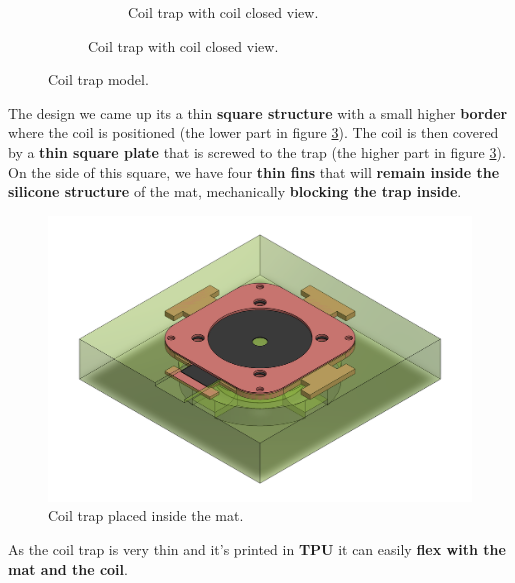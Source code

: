 \begin{figure}[H]
\begin{subfigure}[b]{0.8\linewidth}
\begin{subfigure}[b]{0.475\textwidth}
            \caption{Coil trap with coil closed view.}
            \label{fig: coil_trap_closed}
        \end{subfigure}
    \end{subfigure}   
    \caption{Coil trap model.}
    \label{fig: mat_mold_core_trap}
\end{figure}

The design we came up its a thin \textbf{square structure} with a small higher \textbf{border} where the coil is positioned (the lower part in figure \ref{fig: mat_mold_core_trap}).
The coil is then covered by a \textbf{thin square plate} that is screwed to the trap (the higher part in figure \ref{fig: mat_mold_core_trap}).
On the side of this square, we have four \textbf{thin fins} that will \textbf{remain inside the silicone structure} of the mat, mechanically \textbf{blocking the trap inside}.
\begin{figure}[H]
    \centering
    \includegraphics[width = 0.7\linewidth]{Chapters/Chapter5/Flexible_Mat_Prototypes/Figures/coil_trap_in_mat.png}
    \caption{Coil trap placed inside the mat.}
    \label{fig: coil_trap_in_mat}
\end{figure}
As the coil trap is very thin and it's printed in \textbf{TPU} it can easily \textbf{flex with the mat and the coil}.

